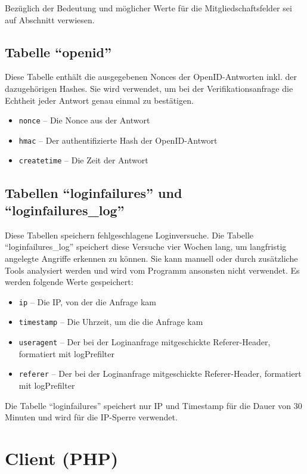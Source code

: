 Bezüglich der Bedeutung und möglicher Werte für die Mitgliedschaftsfelder sei auf Abschnitt  verwiesen.

\subsection{Tabelle "`openid"'}
Diese Tabelle enthält die ausgegebenen Nonces der OpenID-Antworten inkl. der dazugehörigen Hashes.
Sie wird verwendet, um bei der Verifikationsanfrage die Echtheit jeder Antwort genau einmal zu bestätigen.
\begin{itemize}
	\item \texttt{nonce} -- Die Nonce aus der Antwort
	\item \texttt{hmac} -- Der authentifizierte Hash der OpenID-Antwort
	\item \texttt{createtime} -- Die Zeit der Antwort
\end{itemize}

\subsection{Tabellen "`loginfailures"' und "`loginfailures\_log"'}
Diese Tabellen speichern fehlgeschlagene Loginversuche.
Die Tabelle "`loginfailures\_log"' speichert diese Versuche vier Wochen lang, um langfristig angelegte Angriffe erkennen zu können.
Sie kann manuell oder durch zusätzliche Tools analysiert werden und wird vom Programm ansonsten nicht verwendet.
Es werden folgende Werte gespeichert:
\begin{itemize}
	\item \texttt{ip} -- Die IP, von der die Anfrage kam
	\item \texttt{timestamp} -- Die Uhrzeit, um die die Anfrage kam
	\item \texttt{useragent} -- Der bei der Loginanfrage mitgeschickte Referer-Header, formatiert mit logPrefilter
	\item \texttt{referer} -- Der bei der Loginanfrage mitgeschickte Referer-Header, formatiert mit logPrefilter
\end{itemize}

Die Tabelle "`loginfailures"' speichert nur IP und Timestamp für die Dauer von 30 Minuten und wird für die IP-Sperre verwendet.

\section{Client (PHP)}


